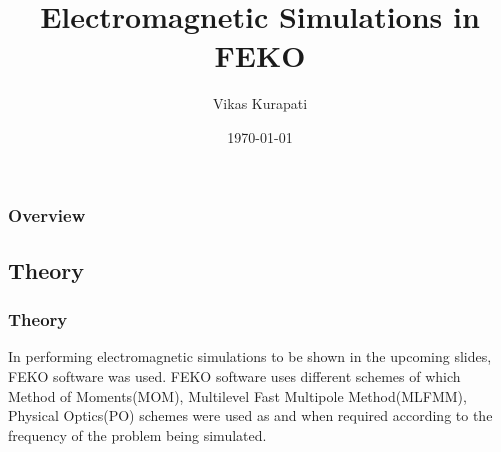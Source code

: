 \documentclass{beamer}
\title[RCS]{Electromagnetic Simulations in FEKO} %
\author{Vikas Kurapati} %
\institute[IITB] %
{
Department of Aerospace Engineering \\ %
\medskip
\textrm{IIT Bombay} %
}
\date{\today} %
\begin{document}
\begin{frame}
\titlepage %
\end{frame}

\begin{frame}
\frametitle{Overview} %
\tableofcontents %
\end{frame}

\begin{frame}
\section{Theory}
\frametitle{Theory}
In performing electromagnetic simulations to be shown in the upcoming slides, FEKO software was used. FEKO software uses different schemes of which Method of Moments(MOM), Multilevel Fast Multipole Method(MLFMM), Physical Optics(PO) schemes were used as and when required according to the frequency of the problem being simulated.
\end{frame}
\end{document}
